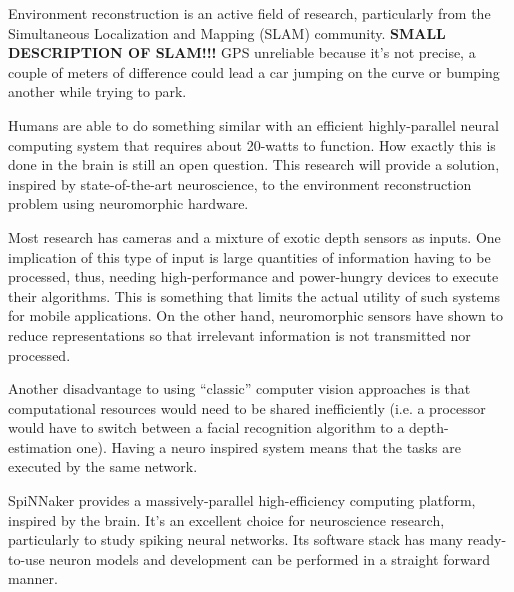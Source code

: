 Environment reconstruction is an active field of research, particularly from the Simultaneous Localization and Mapping (SLAM) community\cite{Thrun2008_SLAM}. \textbf{SMALL DESCRIPTION OF SLAM!!!} GPS unreliable because it's not precise, a couple of meters of difference could lead a car jumping on the curve or bumping another while trying to park.

Humans are able to do something similar with an efficient highly-parallel neural computing system that requires about 20-watts to function. How exactly this is done in the brain is still an open question. This research will provide a solution, inspired by state-of-the-art neuroscience, to the environment reconstruction problem using neuromorphic hardware.

Most research has cameras and a mixture of exotic depth sensors as inputs. One implication of this type of input is large quantities of information having to be processed, thus, needing high-performance and power-hungry devices to execute their algorithms. This is something that limits the actual utility of such systems for mobile applications. On the other hand, neuromorphic sensors have shown to reduce representations so that irrelevant information is not transmitted nor processed.

Another disadvantage to using ``classic'' computer vision approaches is that computational resources would need to be shared inefficiently (i.e. a processor would have to switch between a facial recognition algorithm to a depth-estimation one). Having a neuro inspired system means that the tasks are executed by the same network.

SpiNNaker provides a massively-parallel high-efficiency computing platform, inspired by the brain. It's an excellent choice for neuroscience research, particularly to study spiking neural networks. Its software stack has many ready-to-use neuron models and development can be performed in a straight forward manner. 

